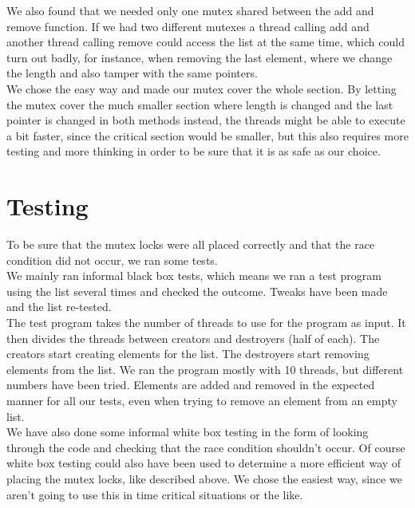 We also found that we needed only one mutex shared between the add and remove function. If we had two different mutexes a thread calling add and another thread calling remove could access the list at the same time, which could turn out badly, for instance, when removing the last element, where we change the length and also tamper with the same pointers.\\

We chose the easy way and made our mutex cover the whole section. By letting the mutex cover the much smaller section where length is changed and the last pointer is changed in both methods instead, the threads might be able to execute a bit faster, since the critical section would be smaller, but this also requires more testing and more thinking in order to be sure that it is as safe as our choice.\\

\section{Testing}
To be sure that the mutex locks were all placed correctly and that the race condition did not occur, we ran some tests.\\

We mainly ran informal black box tests, which means we ran a test program using the list several times and checked the outcome. Tweaks have been made and the list re-tested.\\

The test program takes the number of threads to use for the program as input. It then divides the threads between creators and destroyers (half of each). The creators start creating elements for the list. The destroyers start removing elements from the list. We ran the program mostly with 10 threads, but different numbers have been tried. Elements are added and removed in the expected manner for all our tests, even when trying to remove an element from an empty list.\\

We have also done some informal white box testing in the form of looking through the code and checking that the race condition shouldn't occur. Of course white box testing could also have been used to determine a more efficient way of placing the mutex locks, like described above. We chose the easiest way, since we aren't going to use this in time critical situations or the like.\\
